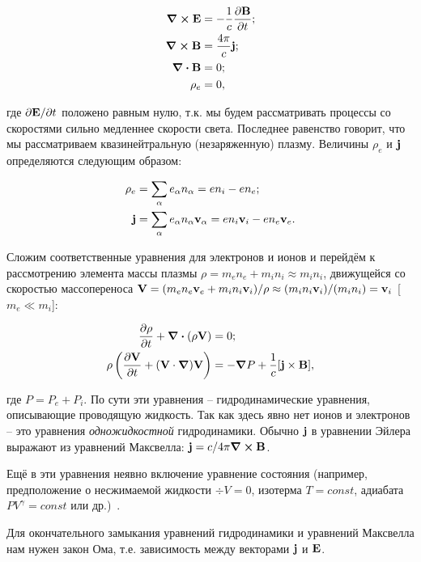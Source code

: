 \documentclass[10pt, a4paper]{article}
\begin{document}
\begin{align*}
	\curl\vb{E} &= -\frac{1}{c}\pdv{\vb{B}}{t}; \\
	\curl\vb{B} &= \frac{4\pi}{c}\vb{j}; \\
	\div{\vb{B}} &= 0;\\
	\rho_e &= 0,
\end{align*}

где $\partial\vb{E}/\partial t$ положено равным нулю, т.к. мы будем рассматривать процессы со скоростями сильно медленнее скорости света. Последнее равенство говорит, что мы рассматриваем квазинейтральную (незаряженную) плазму. Величины $\rho_e$ и $\vb{j}$ определяются следующим образом:

\begin{align*}
	\rho_e &= \sum_\alpha e_\alpha n_\alpha = e n_i - e n_e;\\
	\vb{j} &= \sum_\alpha e_\alpha n_\alpha \vb{v}_\alpha = e n_i \vb{v}_i - e n_e \vb{v}_e.
\end{align*}

Сложим соответственные уравнения для электронов и ионов и перейдём к рассмотрению элемента массы плазмы $\rho = m_en_e + m_in_i\approx m_in_i$, движущейся со скоростью массопереноса $\vb{V} = (m_e n_e \vb{v}_e + m_i n_i \vb{v}_i)/\rho\approx (m_in_i\vb{v}_i)/(m_in_i)=\vb{v}_i$ [$m_e \ll m_i$]:

\begin{align*}
	\pdv{\rho}{t} + \div{\left(\rho \vb{V}\right)} &= 0; \\
	\rho\left( \pdv{\vb{V}}{t} + (\vb{V}\cdot\grad)\vb{V} \right) &= -\grad{P} + \frac{1}{c}[\vb{j}\times\vb{B}],
\end{align*}

где $P = P_e+P_i$. По сути эти уравнения -- гидродинамические уравнения, описывающие проводящую жидкость. Так как здесь явно нет ионов и электронов -- это уравнения \textit{одножидкостной} гидродинамики.
Обычно $\vb{j}$ в уравнении Эйлера выражают из уравнений Максвелла: $\vb{j} = c/4\pi\curl\vb{B}$.

Ещё в эти уравнения неявно включение уравнение состояния (например, предположение о несжимаемой жидкости $\div{V}=0$, изотерма $T=const$, адиабата $PV^\gamma=const$ или др.)~\cite{kroll}.

Для окончательного замыкания уравнений гидродинамики и уравнений Максвелла нам нужен закон Ома, т.е. зависимость между векторами $\vb{j}$ и $\vb{E}$. 
\end{document}
